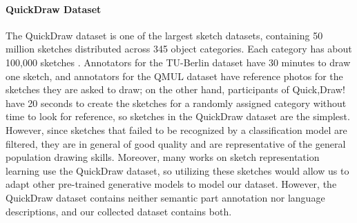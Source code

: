 \paragraph{QuickDraw Dataset}
The QuickDraw dataset is one of the largest sketch datasets, containing 50 million sketches distributed across 345 object categories. Each category has about 100,000 sketches \citep{ha2017neural}. 
Annotators for the TU-Berlin dataset have 30 minutes to draw one sketch, and annotators for the QMUL dataset have reference photos for the sketches they are asked to draw; on the other hand, participants of Quick,Draw! have 20 seconds to create the sketches for a randomly assigned category without time to look for reference, so sketches in the QuickDraw dataset are the simplest. However, since sketches that failed to be recognized by a classification model are filtered, they are in general of good quality and are representative of the general population drawing skills. Moreover, many works on sketch representation learning use the QuickDraw dataset, so utilizing these sketches would allow us to adapt other pre-trained generative models to model our dataset. 
However, the QuickDraw dataset contains neither semantic part annotation nor language descriptions, and our collected dataset contains both.   

